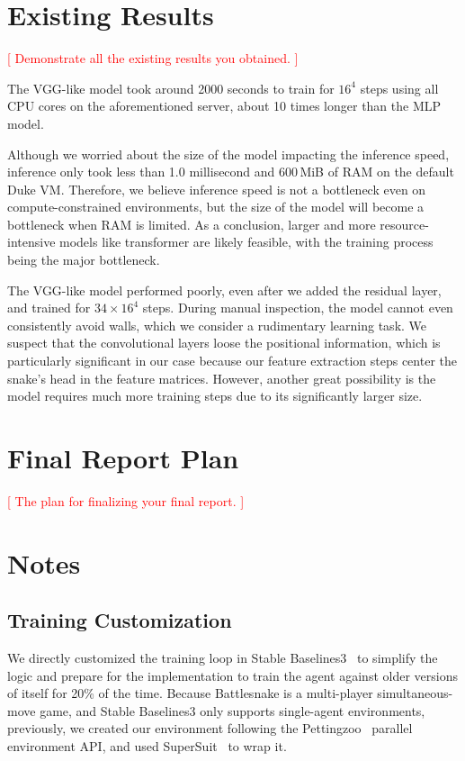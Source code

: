\documentclass[a4paper]{article}
\newcommand{\todo}[1]{\textcolor{red}{[ #1 ]}}
\begin{document}
\section{Existing Results}

\todo{Demonstrate all the existing results you obtained.}

The VGG-like model took around 2000 seconds to train for $16^4$ steps using all
CPU cores on the aforementioned server,
about 10 times longer than the MLP model.

Although we worried about the size of the model impacting the inference speed,
inference only took less than 1.0 millisecond and 600\,MiB of RAM on the default
Duke VM. Therefore,
we believe inference speed is not a bottleneck even on compute-constrained
environments,
but the size of the model will become a bottleneck when RAM is limited.
As a conclusion,
larger and more resource-intensive models like transformer are likely feasible,
with the training process being the major bottleneck.

The VGG-like model performed poorly, even after we added the residual layer,
and trained for $34 \times 16^4$ steps. During manual inspection,
the model cannot even consistently avoid walls,
which we consider a rudimentary learning task.
We suspect that the convolutional layers loose the positional information,
which is particularly significant in our case because our feature extraction
steps center the snake's head in the feature matrices. However,
another great possibility is the model requires much more training steps due to
its significantly larger size.


\section{Final Report Plan}

\todo{The plan for finalizing your final report.}

\section{Notes}

\subsection{Training Customization}

We directly customized the training loop in Stable
Baselines3~\cite{raffin2024stable}
to simplify the logic and prepare for the implementation to train the agent
against older versions of itself for 20\% of the time.
Because Battlesnake is a multi-player simultaneous-move game,
and Stable Baselines3 only supports single-agent environments,
previously, we created our environment
following the Pettingzoo~\cite{terry2021pettingzoo} parallel environment API,
and used SuperSuit~\cite{SuperSuit} to wrap it.
\end{document}
